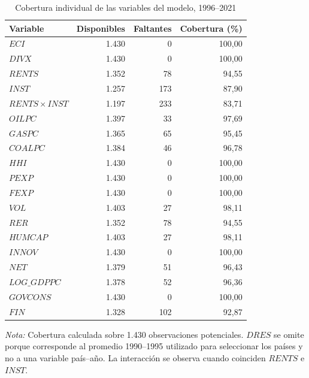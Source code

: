 \documentclass[../../TFM.tex]{subfiles}
\begin{document}
	\begin{table}[htbp]
		\centering
		\caption{Cobertura individual de las variables del modelo, 1996--2021}
		\label{tab:cobertura-individual-cap10}
		\footnotesize
		\renewcommand{\arraystretch}{0.92}
		\setlength{\tabcolsep}{5pt}
		\begin{tabular}{lrrr}
			\toprule
			Variable
			& Disponibles
			& Faltantes
			& Cobertura (\%) \\
			\midrule
			$ECI$                  & 1.430 & 0   & 100,00 \\
			$DIVX$                 & 1.430 & 0   & 100,00 \\
			$RENTS$                & 1.352 & 78  & 94,55 \\
			$INST$                 & 1.257 & 173 & 87,90 \\
			$RENTS\times INST$     & 1.197 & 233 & 83,71 \\
			$OILPC$                & 1.397 & 33  & 97,69 \\
			$GASPC$                & 1.365 & 65  & 95,45 \\
			$COALPC$               & 1.384 & 46  & 96,78 \\
			$HHI$                  & 1.430 & 0   & 100,00 \\
			$PEXP$                 & 1.430 & 0   & 100,00 \\
			$FEXP$                 & 1.430 & 0   & 100,00 \\
			$VOL$                  & 1.403 & 27  & 98,11 \\
			$RER$                  & 1.352 & 78  & 94,55 \\
			$HUMCAP$               & 1.403 & 27  & 98,11 \\
			$INNOV$                & 1.430 & 0   & 100,00 \\
			$NET$                  & 1.379 & 51  & 96,43 \\
			$LOG\_GDPPC$           & 1.378 & 52  & 96,36 \\
			$GOVCONS$              & 1.430 & 0   & 100,00 \\
			$FIN$                  & 1.328 & 102 & 92,87 \\
			\bottomrule
		\end{tabular}
		\begin{minipage}{0.94\textwidth}
			\footnotesize
			\textit{Nota:} Cobertura calculada sobre 1.430 observaciones
			potenciales. $DRES$ se omite porque corresponde al promedio
			1990--1995 utilizado para seleccionar los países y no a una variable
			país--año. La interacción se observa cuando coinciden $RENTS$ e
			$INST$.
		\end{minipage}
	\end{table}
\end{document}
